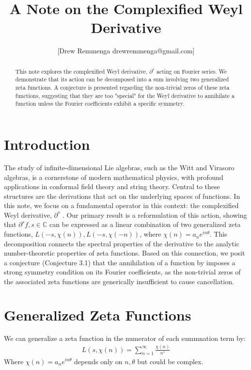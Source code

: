 \documentclass{artjlt}
\title{A Note on the Complexified Weyl Derivative}
\author{[Drew Remmenga drewremmenga@gmail.com]}
\newcommand{\?}{\textbackslash}
\newcommand{\C}{\mathbb{C}}
\begin{document}
\maketitle
\begin{abstract}
  This note explores the complexified Weyl derivative, $\partial^s$ acting on Fourier series. 
We demonstrate that its action can be decomposed into a sum involving two generalized zeta functions. 
A conjecture is presented regarding the non-trivial zeros of these zeta functions, suggesting that they are too "special" for the Weyl derivative to annihilate a function unless the Fourier coefficients exhibit a specific symmetry.
\end{abstract}
\section{Introduction}
The study of infinite-dimensional Lie algebras, such as the Witt and Virasoro algebras, is a cornerstone of modern mathematical physics, with profound applications in conformal field theory and string theory. Central to these structures are the derivations that act on the underlying spaces of functions. In this note, we focus on a fundamental operator in this context: the complexified Weyl derivative, $\partial^s$ \cite{article}.
Our primary result is a reformulation of this action, showing that $\partial^s f, s \in \C$ can be expressed as a linear combination of two generalized zeta functions, $L(-s,\chi(n)), L(-s,\chi(-n))$, where $\chi(n) =a_n e^{i n \theta}$. This decomposition connects the spectral properties of the derivative to the analytic number-theoretic properties of zeta functions. Based on this connection, we posit a conjecture (Conjecture 3.1) that the annihilation of a function by imposes a strong symmetry condition on its Fourier coefficients, as the non-trivial zeros of the associated zeta functions are generically insufficient to cause cancellation.
\section{Generalized Zeta Functions}
We can generalize a zeta function in the numerator of each summnation term by:
\begin{align*}
  L(s,\chi(n)) = \sum_{n=1}^{\infty}\frac{\chi(n)}{n^s}
\end{align*}
Where $\chi(n)= a_n e^{i n \theta}$ depends only on $n,\theta$ but could be complex. 
\end{document}
